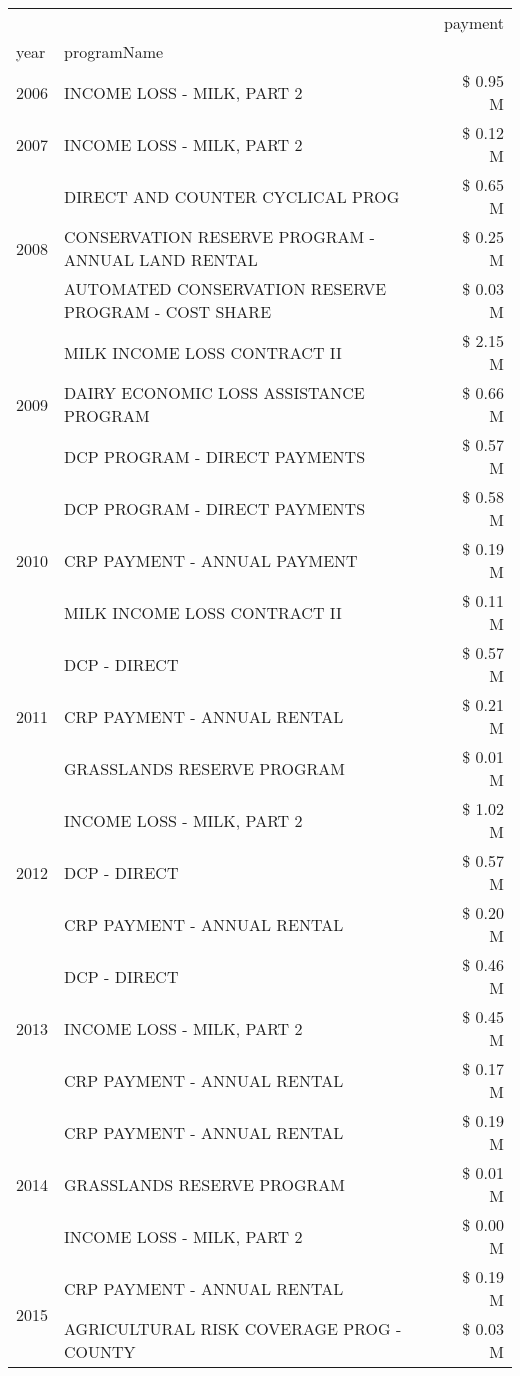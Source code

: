\begin{tabular}{llr}
\toprule
 &  & payment \\
year & programName &  \\
\midrule
2006 & INCOME LOSS - MILK, PART 2 & \$ 0.95 M \\
\cline{1-3}
2007 & INCOME LOSS - MILK, PART 2 & \$ 0.12 M \\
\cline{1-3}
\multirow[t]{3}{*}{2008} & DIRECT AND COUNTER CYCLICAL PROG & \$ 0.65 M \\
 & CONSERVATION RESERVE PROGRAM - ANNUAL LAND RENTAL & \$ 0.25 M \\
 & AUTOMATED CONSERVATION RESERVE PROGRAM - COST SHARE & \$ 0.03 M \\
\cline{1-3}
\multirow[t]{3}{*}{2009} & MILK INCOME LOSS CONTRACT II & \$ 2.15 M \\
 & DAIRY ECONOMIC LOSS ASSISTANCE PROGRAM & \$ 0.66 M \\
 & DCP PROGRAM - DIRECT PAYMENTS & \$ 0.57 M \\
\cline{1-3}
\multirow[t]{3}{*}{2010} & DCP PROGRAM - DIRECT PAYMENTS & \$ 0.58 M \\
 & CRP PAYMENT - ANNUAL PAYMENT & \$ 0.19 M \\
 & MILK INCOME LOSS CONTRACT II & \$ 0.11 M \\
\cline{1-3}
\multirow[t]{3}{*}{2011} & DCP - DIRECT & \$ 0.57 M \\
 & CRP PAYMENT - ANNUAL RENTAL & \$ 0.21 M \\
 & GRASSLANDS RESERVE PROGRAM & \$ 0.01 M \\
\cline{1-3}
\multirow[t]{3}{*}{2012} & INCOME LOSS - MILK, PART 2 & \$ 1.02 M \\
 & DCP - DIRECT & \$ 0.57 M \\
 & CRP PAYMENT - ANNUAL RENTAL & \$ 0.20 M \\
\cline{1-3}
\multirow[t]{3}{*}{2013} & DCP - DIRECT & \$ 0.46 M \\
 & INCOME LOSS - MILK, PART 2 & \$ 0.45 M \\
 & CRP PAYMENT - ANNUAL RENTAL & \$ 0.17 M \\
\cline{1-3}
\multirow[t]{3}{*}{2014} & CRP PAYMENT - ANNUAL RENTAL & \$ 0.19 M \\
 & GRASSLANDS RESERVE PROGRAM & \$ 0.01 M \\
 & INCOME LOSS - MILK, PART 2 & \$ 0.00 M \\
\cline{1-3}
\multirow[t]{3}{*}{2015} & CRP PAYMENT - ANNUAL RENTAL & \$ 0.19 M \\
 & AGRICULTURAL RISK COVERAGE PROG - COUNTY & \$ 0.03 M \\

\end{tabular}
